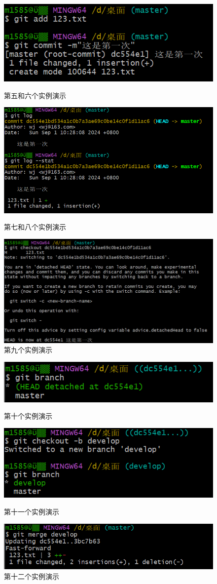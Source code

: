 \documentclass[a4paper, 12pt]{article}
\begin{document}
		\begin{figure}[h!]
			\includegraphics[width=1\textwidth]{5-6}
			\caption{第五和六个实例演示}
			\includegraphics[width=1\textwidth]{7-8}
			\caption{第七和八个实例演示}
			\includegraphics[width=1\textwidth]{9}
			\caption{第九个实例演示}
		\end{figure}
		\begin{figure}[h!]
			\includegraphics[width=1\textwidth]{10}
			\caption{第十个实例演示}
			\includegraphics[width=1\textwidth]{11}
			\caption{第十一个实例演示}
			\includegraphics[width=1\textwidth]{12}
			\caption{第十二个实例演示}
		\end{figure}
		
\end{document}
